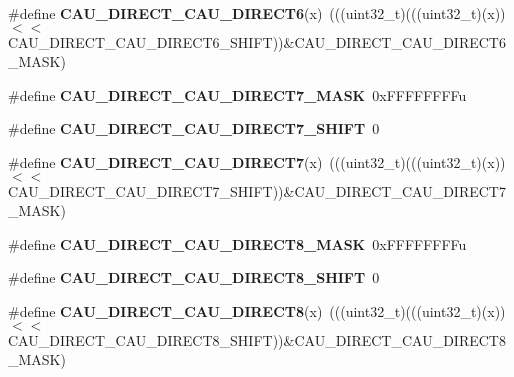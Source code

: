 \begin{DoxyCompactItemize}
\item 
\#define {\bfseries C\+A\+U\+\_\+\+D\+I\+R\+E\+C\+T\+\_\+\+C\+A\+U\+\_\+\+D\+I\+R\+E\+C\+T6}(x)~(((uint32\+\_\+t)(((uint32\+\_\+t)(x))$<$$<$C\+A\+U\+\_\+\+D\+I\+R\+E\+C\+T\+\_\+\+C\+A\+U\+\_\+\+D\+I\+R\+E\+C\+T6\+\_\+\+S\+H\+I\+FT))\&C\+A\+U\+\_\+\+D\+I\+R\+E\+C\+T\+\_\+\+C\+A\+U\+\_\+\+D\+I\+R\+E\+C\+T6\+\_\+\+M\+A\+SK)\hypertarget{group__CAU__Register__Masks_gafd7a2e3e43805f32a2af9474502113b6}{}\label{group__CAU__Register__Masks_gafd7a2e3e43805f32a2af9474502113b6}

\item 
\#define {\bfseries C\+A\+U\+\_\+\+D\+I\+R\+E\+C\+T\+\_\+\+C\+A\+U\+\_\+\+D\+I\+R\+E\+C\+T7\+\_\+\+M\+A\+SK}~0x\+F\+F\+F\+F\+F\+F\+F\+Fu\hypertarget{group__CAU__Register__Masks_gab06d5ca76014069c1511818f08442a16}{}\label{group__CAU__Register__Masks_gab06d5ca76014069c1511818f08442a16}

\item 
\#define {\bfseries C\+A\+U\+\_\+\+D\+I\+R\+E\+C\+T\+\_\+\+C\+A\+U\+\_\+\+D\+I\+R\+E\+C\+T7\+\_\+\+S\+H\+I\+FT}~0\hypertarget{group__CAU__Register__Masks_ga779a3fffe17b85f4298a9d6b2265d543}{}\label{group__CAU__Register__Masks_ga779a3fffe17b85f4298a9d6b2265d543}

\item 
\#define {\bfseries C\+A\+U\+\_\+\+D\+I\+R\+E\+C\+T\+\_\+\+C\+A\+U\+\_\+\+D\+I\+R\+E\+C\+T7}(x)~(((uint32\+\_\+t)(((uint32\+\_\+t)(x))$<$$<$C\+A\+U\+\_\+\+D\+I\+R\+E\+C\+T\+\_\+\+C\+A\+U\+\_\+\+D\+I\+R\+E\+C\+T7\+\_\+\+S\+H\+I\+FT))\&C\+A\+U\+\_\+\+D\+I\+R\+E\+C\+T\+\_\+\+C\+A\+U\+\_\+\+D\+I\+R\+E\+C\+T7\+\_\+\+M\+A\+SK)\hypertarget{group__CAU__Register__Masks_ga6d1edd9596946b0957b74d8d8e0316f0}{}\label{group__CAU__Register__Masks_ga6d1edd9596946b0957b74d8d8e0316f0}

\item 
\#define {\bfseries C\+A\+U\+\_\+\+D\+I\+R\+E\+C\+T\+\_\+\+C\+A\+U\+\_\+\+D\+I\+R\+E\+C\+T8\+\_\+\+M\+A\+SK}~0x\+F\+F\+F\+F\+F\+F\+F\+Fu\hypertarget{group__CAU__Register__Masks_ga8999b171027ec70233192fd566cdd6fd}{}\label{group__CAU__Register__Masks_ga8999b171027ec70233192fd566cdd6fd}

\item 
\#define {\bfseries C\+A\+U\+\_\+\+D\+I\+R\+E\+C\+T\+\_\+\+C\+A\+U\+\_\+\+D\+I\+R\+E\+C\+T8\+\_\+\+S\+H\+I\+FT}~0\hypertarget{group__CAU__Register__Masks_gaae1fbd7c8c40fd07e3928b29d1dcfd0b}{}\label{group__CAU__Register__Masks_gaae1fbd7c8c40fd07e3928b29d1dcfd0b}

\item 
\#define {\bfseries C\+A\+U\+\_\+\+D\+I\+R\+E\+C\+T\+\_\+\+C\+A\+U\+\_\+\+D\+I\+R\+E\+C\+T8}(x)~(((uint32\+\_\+t)(((uint32\+\_\+t)(x))$<$$<$C\+A\+U\+\_\+\+D\+I\+R\+E\+C\+T\+\_\+\+C\+A\+U\+\_\+\+D\+I\+R\+E\+C\+T8\+\_\+\+S\+H\+I\+FT))\&C\+A\+U\+\_\+\+D\+I\+R\+E\+C\+T\+\_\+\+C\+A\+U\+\_\+\+D\+I\+R\+E\+C\+T8\+\_\+\+M\+A\+SK)\hypertarget{group__CAU__Register__Masks_ga14f69dcb73370620d040cad8fbfa94b1}{}\label{group__CAU__Register__Masks_ga14f69dcb73370620d040cad8fbfa94b1}


\end{DoxyCompactItemize}
